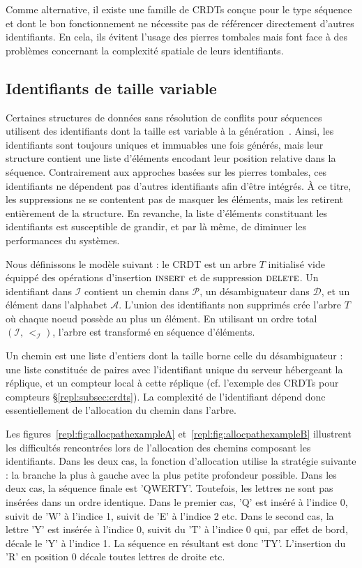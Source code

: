 Comme alternative, il existe une famille de CRDTs conçue pour le type séquence
et dont le bon fonctionnement ne nécessite pas de référencer directement
d'autres identifiants. En cela, ils évitent l'usage des pierres tombales mais
font face à des problèmes concernant la complexité spatiale de leurs
identifiants.

\subsection{Identifiants de taille variable}
\label{repl:subsec:variable}

Certaines structures de données sans résolution de conflits pour séquences
utilisent des identifiants dont la taille est variable à la
génération~\cite{andre2013supporting, preguica2009commutative,
  weiss2009logoot}. Ainsi, les identifiants sont toujours uniques et immuables
une fois générés, mais leur structure contient une liste d'éléments encodant
leur position relative dans la séquence.  Contrairement aux approches basées sur
les pierres tombales, ces identifiants ne dépendent pas d'autres identifiants
afin d'être intégrés. À ce titre, les suppressions ne se contentent pas de
masquer les éléments, mais les retirent entièrement de la structure. En
revanche, la liste d'éléments constituant les identifiants est susceptible de
grandir, et par là même, de diminuer les performances du systèmes.

Nous définissons le modèle suivant : le CRDT est un arbre $T$ initialisé vide
équippé des opérations d'insertion $\textsc{insert}$ et de suppression
$\textsc{delete}$. Un identifiant dans $\mathcal{I}$ contient un chemin dans
$\mathcal{P}$, un désambiguateur dans $\mathcal{D}$, et un élément dans
l'alphabet $\mathcal{A}$. L'union des identifiants non supprimés crée l'arbre
$T$ où chaque noeud possède au plus un élément.  En utilisant un ordre total
$(\mathcal{I},\, <_\mathcal{I})$, l'arbre est transformé en séquence d'éléments.

Un chemin est une liste d'entiers dont la taille borne celle du désambiguateur :
une liste constituée de paires avec l'identifiant unique du serveur hébergeant
la réplique, et un compteur local à cette réplique (cf. l'exemple des CRDTs pour
compteurs §\ref{repl:subsec:crdts}). La complexité de l'identifiant dépend donc
essentiellement de l'allocation du chemin dans l'arbre.

Les figures~\ref{repl:fig:allocpathexampleA} et~\ref{repl:fig:allocpathexampleB}
illustrent les difficultés rencontrées lors de l'allocation des chemins
composant les identifiants. Dans les deux cas, la fonction d'allocation utilise
la stratégie suivante : la branche la plus à gauche avec la plus petite
profondeur possible. Dans les deux cas, la séquence finale est
'QWERTY'. Toutefois, les lettres ne sont pas insérées dans un ordre
identique. Dans le premier cas, 'Q' est inséré à l'indice 0, suivit de 'W' à
l'indice 1, suivit de 'E' à l'indice 2 etc.  Dans le second cas, la lettre 'Y'
est insérée à l'indice 0, suivit du 'T' à l'indice 0 qui, par effet de bord,
décale le 'Y' à l'indice 1. La séquence en résultant est donc 'TY'. L'insertion
du 'R' en position 0 décale toutes lettres de droite etc.


